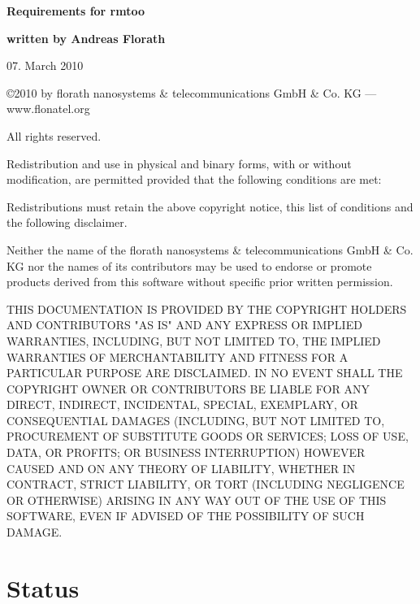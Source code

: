 \documentclass{article}
\begin{document}
\thispagestyle{empty}

\mbox{}

\vfill

{\LARGE\textbf{Requirements for rmtoo}}

\vfill

{\Large\textbf{written by Andreas Florath}}

\vfill

07. March 2010

\vfill

\newpage

\mbox{}

\vfill

{\small

\copyright 2010 by florath nanosystems \& telecommunications GmbH \& Co. KG
--- www.flonatel.org 

All rights reserved.

Redistribution and use in physical and binary forms, with or without
modification, are permitted provided that the following conditions are
met:

Redistributions must retain the above copyright notice, this list of
conditions and the following disclaimer.

Neither the name of the florath nanosystems \& telecommunications GmbH
\& Co. KG nor the names of its contributors may be used to endorse or
promote products derived from this software without specific prior
written permission.

THIS DOCUMENTATION IS PROVIDED BY THE COPYRIGHT HOLDERS AND
CONTRIBUTORS "AS IS" AND ANY EXPRESS OR IMPLIED WARRANTIES, INCLUDING,
BUT NOT LIMITED TO, THE IMPLIED WARRANTIES OF MERCHANTABILITY AND
FITNESS FOR A PARTICULAR PURPOSE ARE DISCLAIMED. IN NO EVENT SHALL THE
COPYRIGHT OWNER OR CONTRIBUTORS BE LIABLE FOR ANY DIRECT, INDIRECT,
INCIDENTAL, SPECIAL, EXEMPLARY, OR CONSEQUENTIAL DAMAGES (INCLUDING,
BUT NOT LIMITED TO, PROCUREMENT OF SUBSTITUTE GOODS OR SERVICES; LOSS
OF USE, DATA, OR PROFITS; OR BUSINESS INTERRUPTION) HOWEVER CAUSED AND
ON ANY THEORY OF LIABILITY, WHETHER IN CONTRACT, STRICT LIABILITY, OR
TORT (INCLUDING NEGLIGENCE OR OTHERWISE) ARISING IN ANY WAY OUT OF THE
USE OF THIS SOFTWARE, EVEN IF ADVISED OF THE POSSIBILITY OF SUCH
DAMAGE.
}
\newpage

\tableofcontents

\newpage

\section{Status}

\end{document}
